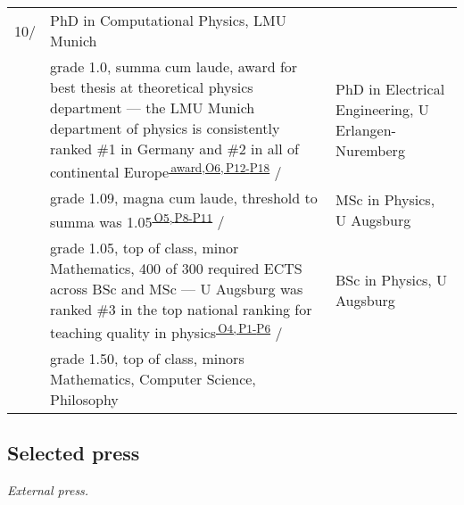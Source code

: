 \begin{longtable}[t]{R{\widthC} p{\widthB}}
10/
&PhD in Computational Physics, LMU Munich\\ 
&{\footnotesize grade 1.0, summa cum laude, award for best thesis at theoretical physics department --- the LMU Munich department of physics is consistently ranked \#1 in Germany and \#2 in all of continental Europe\textsuperscript{\hyperlink{phdprize}{\,award,}}\textsuperscript{\hyperlink{O6}{O6,\,}\hyperlink{P12}{P12-}\hyperlink{P18}{P18}}}
/
&PhD in Electrical Engineering, U Erlangen-Nuremberg\\ 
&{\footnotesize grade 1.09, magna cum laude, threshold to summa was 1.05\textsuperscript{\hyperlink{O5}{\,O5,\,}\hyperlink{P8}{P8-}\hyperlink{P11}{P11}}}
/
& MSc in Physics, U Augsburg\\ 
&{\footnotesize grade 1.05, top of class,  
minor Mathematics, 400 of 300 required ECTS across BSc and MSc --- U Augsburg was ranked \#3 in the top national ranking for teaching quality in physics\textsuperscript{\hyperlink{O4}{\,O4,\,}\hyperlink{P1}{P1-}\hyperlink{P6}{P6}}}%
/ 
& BSc in Physics, U Augsburg\\
&{\footnotesize grade 1.50, top of class,
minors Mathematics, Computer Science, Philosophy}
\end{longtable}

\subsection*{Selected press }

\noindent \textit{External press.}

